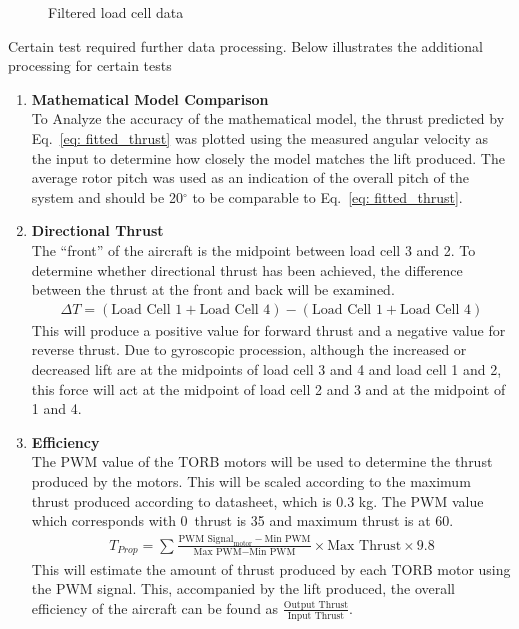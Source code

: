 \begin{figure}[h]
\begin{minipage}{0.45\textwidth}
                \caption{Filtered load cell data} 
                \label{fig: Filtered_loadcell}
            \end{minipage}
        \end{figure} 

        Certain test required further data processing. Below illustrates the additional processing for certain tests
        \begin{enumerate}
            \item \textbf{Mathematical Model Comparison}\\
                To Analyze the accuracy of the mathematical model, the thrust predicted by Eq.~\ref{eq: fitted_thrust} was plotted using the measured angular velocity as the input to determine how closely the model matches the lift produced. The average rotor pitch was used as an indication of the overall pitch of the system and should be 20\(^\circ\) to be comparable to Eq.~\ref{eq: fitted_thrust}.\\
            \item \textbf{Directional Thrust}\\
                The “front” of the aircraft is the midpoint between load cell 3 and 2. To determine whether directional thrust has been achieved, the difference between the thrust at the front and back will be examined. 
                \begin{align}
                    \Delta T = (\text{Load Cell 1} + \text{Load Cell 4}) - (\text{Load Cell 1} + \text{Load Cell 4})
                \end{align}
                This will produce a positive value for forward thrust and a negative value for reverse thrust. Due to gyroscopic procession, although the increased or decreased lift are at the midpoints of load cell 3 and 4 and load cell 1 and 2, this force will act at the midpoint of load cell 2 and 3 and at the midpoint of 1 and 4.
            \item \textbf{Efficiency}\\
                The PWM value of the TORB motors will be used to determine the thrust produced by the motors. This will be scaled according to the maximum thrust produced according to datasheet, which is 0.3 kg. The PWM value which corresponds with 0~thrust is 35 and maximum thrust is at 60.
                \begin{align}
                    T_{Prop} = \sum_{}^{} \frac{\text{PWM Signal}_\text{motor} - \text{Min PWM}}{ \text{Max PWM} -  \text{Min PWM}}\times  \text{Max Thrust}\times 9.8      \label{eq: pwm_thrust_con}
                \end{align}
                This will estimate the amount of thrust produced by each TORB motor using the PWM signal. This, accompanied by the lift produced, the overall efficiency of the aircraft can be found as \(\frac{\text{Output Thrust}}{\text{Input Thrust}}\).
        \end{enumerate} 

